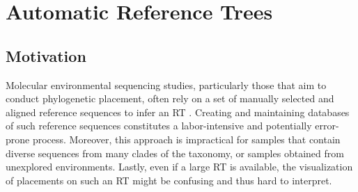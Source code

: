 
\chapter{Automatic Reference Trees}
\label{ch:AutomaticTrees}



\section{Motivation}
\label{ch:AutomaticTrees:sec:Motivation}

Molecular environmental sequencing studies, particularly those that aim to conduct phylogenetic placement,
often rely on a set of manually selected and aligned reference sequences
to infer an \ac{RT} \cite{Tedersoo2014,DeVargas2015,Mahe2017,Thompson2017}. %
Creating and maintaining databases of such reference sequences constitutes a labor-intensive and potentially error-prone process.
Moreover, this approach is impractical for samples that contain diverse sequences from many clades of the taxonomy,
or samples obtained from unexplored environments.
Lastly, even if a large \ac{RT} is available,
the visualization of placements on such an \ac{RT} might be confusing and thus hard to interpret.

